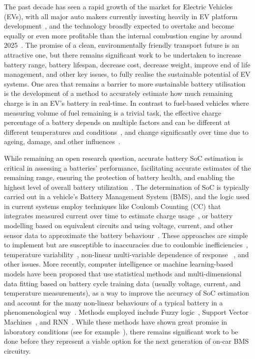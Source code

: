 %
%
The past decade has seen a rapid growth of the market for Electric Vehicles (EVs), with all major auto makers currently investing heavily in EV platform development~\cite{iea_global_2023}, and the technology broadly expected to overtake and become equally or even more profitable than the internal combustion engine by around 2025~\cite{baik_making_2019}.
The promise of a clean, environmentally friendly transport future is an attractive one, but there remains significant work to be undertaken to increase battery range, battery lifespan, decrease cost, decrease weight, improve end of life management, and other key issues, to fully realise the sustainable potential of EV systems.
One area that remains a barrier to more sustainable battery utilisation is the development of a method to accurately estimate how much remaining charge is in an EV's battery in real-time.
In contrast to fuel-based vehicles where measuring volume of fuel remaining is a trivial task, the effective charge percentage of a battery depends on multiple factors and can be different at different temperatures and conditions~\cite{xing_state_2014}, and change significantly over time due to ageing, damage, and other influences~\cite{johansson_neural_2018}.

%
%
While remaining an open research question, accurate battery SoC estimation is critical in assessing a batteries' performance, facilitating accurate estimates of the remaining range, ensuring the protection of battery health, and enabling the highest level of overall battery utilization~\cite{yamin_embedded_2014}.
The determination of SoC is typically carried out in a vehicle's Battery Management System (BMS), and the logic used in current systems employ techniques like Coulomb Counting (CC) that integrates measured current over time to estimate charge usage~\cite{robust_SoC}, or battery modelling based on equivalent circuits and using voltage, current, and other sensor data to approximate the battery behaviour~\cite{robust_SoC,6953745,ng_enhanced_2009}.
These approaches are simple to implement but are susceptible to inaccuracies due to coulombic inefficiencies~\cite{Smith_2010}, temperature variability~\cite{xing_state_2014}, non-linear multi-variable dependence of response ~\cite{hansen_support_2005,anton_battery_2013,he_state_2014}, and other issues.
More recently, computer intelligence or machine learning-based models have been proposed that use statistical methods and multi-dimensional data fitting based on battery cycle training data (usually voltage, current, and temperature measurements), as a way to improve the accuracy of SoC estimation and account for the many non-linear behaviours of a typical battery in a phenomenological way~\cite{hansen_support_2005,anton_battery_2013,he_state_2014}.
Methods employed include Fuzzy logic~\cite{malkhandi_fuzzy_2006}, Support Vector Machines~\cite{hansen_support_2005, anton_battery_2013}, and RNN~\cite{song_lithium-ion_2018,Chemali2017,mamo_long_2020,jiao_gru-rnn_2020,xiao_accurate_2019,javid_adaptive_2020,zhang_deep_2020}.
While these methods have shown great promise in laboratory conditions (see for example~\cite{jiao_gru-rnn_2020}), there remains significant work to be done before they represent a viable option for the next generation of on-car BMS circuitry.

